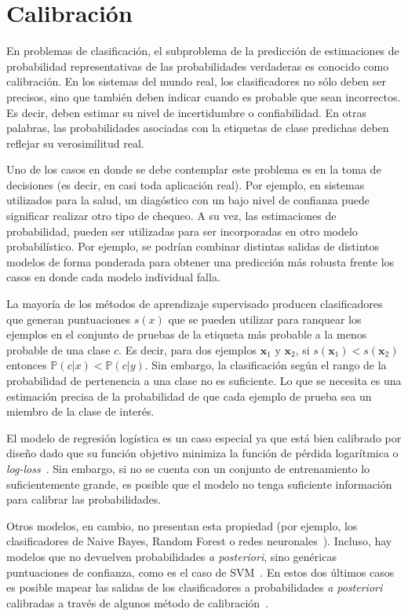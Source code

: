 \chapter{Calibración}\label{appendix:calibracion} 

En problemas de clasificación, el subproblema de la predicción de estimaciones
de probabilidad representativas de las probabilidades verdaderas es conocido
como calibración. En los sistemas del mundo real, los clasificadores no sólo
deben ser precisos, sino que también deben indicar cuando es probable que sean
incorrectos. Es decir, deben estimar su nivel de incertidumbre o confiabilidad.
En otras palabras, las probabilidades asociadas con la etiquetas de clase
predichas deben reflejar su verosimilitud real.

Uno de los casos en donde se debe contemplar este problema es en la toma de
decisiones (es decir, en casi toda aplicación real). Por ejemplo, en sistemas
utilizados para la salud, un diagóstico con un bajo nivel de confianza puede
significar realizar otro tipo de chequeo. A su vez, las estimaciones de
probabilidad, pueden ser utilizadas para ser incorporadas en otro modelo
probabilístico. Por ejemplo, se podrían combinar distintas salidas de distintos
modelos de forma ponderada para obtener una predicción más robusta frente los
casos en donde cada modelo individual falla.

La mayoría de los métodos de aprendizaje supervisado producen clasificadores que
generan puntuaciones \(s(x)\) que se pueden utilizar para ranquear los ejemplos
en el conjunto de pruebas de la etiqueta más probable a la menos probable de una
clase \(c\). Es decir, para dos ejemplos \( \mathbf{x}_1\) y \( \mathbf{x}_2\),
si \(s( \mathbf{x}_1) < s( \mathbf{x}_2)\) entonces \(\mathbb{P}(c|x) <
\mathbb{P}(c|y)\). Sin embargo, la clasificación según el rango de la
probabilidad de pertenencia a una clase no es suficiente. Lo que se necesita es
una estimación precisa de la probabilidad de que cada ejemplo de prueba sea un
miembro de la clase de interés.

El modelo de regresión logística es un caso especial ya que está bien calibrado
por diseño dado que su función objetivo minimiza la función de pérdida
logarítmica o {\it log-loss\/}~\cite{morrison2013tutorial}. Sin  embargo, si no
se cuenta con un conjunto de entrenamiento lo suficientemente grande, es posible
que el modelo no tenga suficiente información para calibrar las probabilidades.

Otros modelos, en cambio, no presentan esta propiedad (por ejemplo, los
clasificadores de Naive Bayes, Random Forest o redes
neuronales~\cite{zadrozny2002transforming, niculescu2005predicting,
guo2017calibration}). Incluso, hay modelos que no devuelven probabilidades {\it
a posteriori}, sino genéricas puntuaciones de confianza, como es el caso de
SVM~\cite{platt1999probabilistic}. En estos dos últimos casos es posible mapear
las salidas de los clasificadores a probabilidades {\it a posteriori\/}
calibradas a través de algunos método de
calibración~\cite{platt1999probabilistic, zadrozny2002transforming,
niculescu2005predicting, guo2017calibration}.

